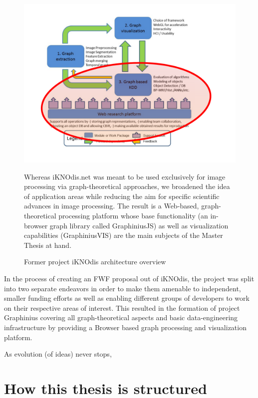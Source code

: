 \begin{figure}[ht]
	\includegraphics[width=1.1\textwidth]{figures/iKNOdis_OGMA_structure}
	\caption{Former project iKNOdis architecture overview}
	\label{fig_iKNOdis_structure}
	\small
	Whereas iKNOdis.net was meant to be used exclusively for image processing via graph-theoretical approaches, we broadened the idea of application areas while reducing the aim for specific scientific advances in image processing. The result is a Web-based, graph-theoretical processing platform whose base functionality (an in-browser graph library called GraphiniusJS) as well as visualization capabilities (GraphiniusVIS) are the main subjects of the Master Thesis at hand.
\end{figure}

In the process of creating an FWF proposal out of iKNOdis, the project was split into two separate endeavors in order to make them amenable to independent, smaller funding efforts as well as enabling different groups of developers to work on their respective areas of interest. This resulted in the formation of project Graphinius covering all graph-theoretical aspects and basic data-engineering infrastructure \cite{DataAnalysisDSWorkflow} by providing a Browser based graph processing and visualization platform. 

As evolution (of ideas) never stops, 





\section{How this thesis is structured}
\label{section:thesis_structure}

